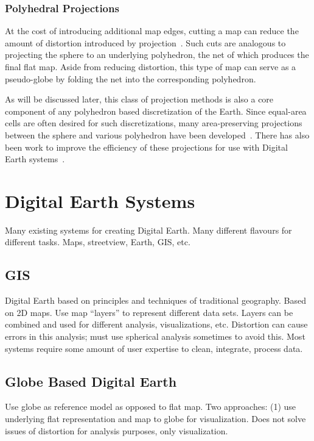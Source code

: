 \subsubsection{Polyhedral Projections}
At the cost of introducing additional map edges, cutting a map can reduce the amount of distortion introduced by projection~\cite{soliman2018optimal}.
Such cuts are analogous to projecting the sphere to an underlying polyhedron, the net of which produces the final flat map.
Aside from reducing distortion, this type of map can serve as a pseudo-globe by folding the net into the corresponding polyhedron.


As will be discussed later, this class of projection methods is also a core component of any polyhedron based discretization of the Earth.
Since equal-area cells are often desired for such discretizations, many area-preserving projections between the sphere and various polyhedron have been developed~\cite{bradley1946equal, snyder1992equal, van2006slice, rocsca2011uniform, rocsca2012area, holhocs2014octahedral}.
There has also been work to improve the efficiency of these projections for use with Digital Earth systems~\cite{harrison2011optimization}.


\section{Digital Earth Systems}
Many existing systems for creating Digital Earth.
Many different flavours for different tasks.
Maps, streetview, Earth, GIS, etc.
\cite{mahdavi2015survey}
\cite{alderson2020digital}


\subsection{GIS}
Digital Earth based on principles and techniques of traditional geography.
Based on 2D maps.
Use map ``layers'' to represent different data sets.
Layers can be combined and used for different analysis, visualizations, etc.
Distortion can cause errors in this analysis; must use spherical analysis sometimes to avoid this.
Most systems require some amount of user expertise to clean, integrate, process data.
\cite{antenucci1991geographic}
\cite{foresman1998history}


\subsection{Globe Based Digital Earth}
Use globe as reference model as opposed to flat map.
Two approaches:
(1) use underlying flat representation and map to globe for visualization.
Does not solve issues of distortion for analysis purposes, only visualization.
\cite{goodchild2018reimagining}


